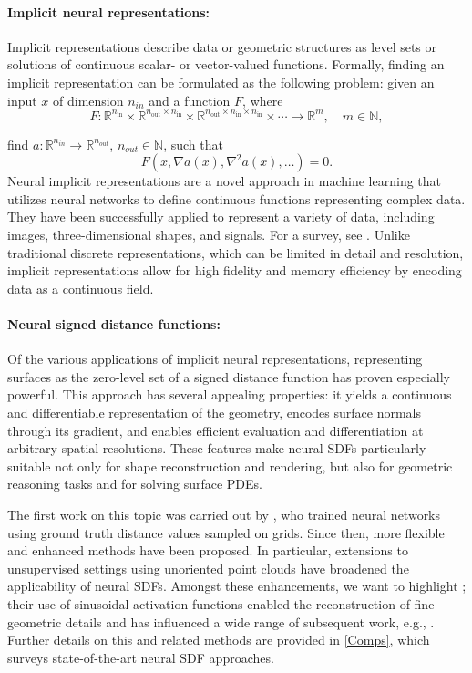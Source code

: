 \documentclass[12pt,openany]{book}
\newcommand{\R}{\mathbb{R}}
\theoremstyle{plainnormal}
\theoremstyle{remark}
\begin{document}
\paragraph{Implicit neural representations:} 
Implicit representations describe data or geometric structures as level sets or solutions of continuous scalar- or vector-valued functions. Formally, finding an implicit representation can be formulated as the following problem: given an input $x$ of dimension $n_{in}$ and a function $F$, where
\[
F: \mathbb{R}^{n_{\text{in}}} \times \mathbb{R}^{n_{\text{out}} \times n_{\text{in}}} \times \mathbb{R}^{n_{\text{out}} \times n_{\text{in}} \times n_{\text{in}}} \times \cdots \rightarrow \mathbb{R}^m, \quad m \in \mathbb N,
\]

find $a: \R^{n_{in}} \rightarrow \R^{n_{out}}$, $n_{{out}}\in \mathbb{N}$, such that $$F(x, \nabla a(x), \nabla^2a(x), \dots) = 0.$$ 
Neural implicit representations are a novel approach in machine learning that utilizes neural networks to define continuous functions representing complex data. They have been successfully applied to represent a variety of data, including images, three-dimensional shapes, and signals. For a survey, see \cite{essakine2025standimplicitneuralrepresentations}. Unlike traditional discrete representations, which can be limited in detail and resolution, implicit representations allow for high fidelity and memory efficiency by encoding data as a continuous field.
  
\paragraph{Neural signed distance functions:}  
Of the various applications of implicit neural representations, representing surfaces as the zero-level set of a signed distance function has proven especially powerful.
This approach has several appealing properties: it yields a continuous and differentiable representation of the geometry, encodes surface normals through its gradient, and enables efficient evaluation and differentiation at arbitrary spatial resolutions. These features make neural SDFs particularly suitable not only for shape reconstruction and rendering, but also for geometric reasoning tasks and for solving surface PDEs.\par
The first work on this topic was carried out by \cite{park2019deepsdflearningcontinuoussigned}, who trained neural networks using ground truth distance values sampled on grids. Since then, more flexible and enhanced methods have been proposed. In particular, extensions to unsupervised settings using unoriented point clouds have broadened the applicability of neural SDFs. Amongst these enhancements, we want to highlight \cite{sitzmann2020implicitneuralrepresentationsperiodic}; their use of sinusoidal activation functions enabled the reconstruction of fine geometric details and has influenced a wide range of subsequent work, e.g., \cite{wang2023neuralsingularhessianimplicitneuralrepresentation}. Further details on this and related methods are provided in \cref{Comps}, which surveys state-of-the-art neural SDF approaches.
\end{document}
